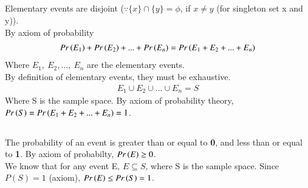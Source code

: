 \documentclass[journal,12pt,twocolumn]{IEEEtran}
\begin{document}
\subsection{}
Elementary events are disjoint ($\because \{x\}\cap\{y\}=\phi$, if $x\neq y$ (for singleton set x and y)).\\
By axiom of probability 
\begin{align}
	Pr\left(E_1\right)+Pr\left(E_2\right)+...+Pr\left(E_n\right)=Pr\left(E_1+ E_2+ ...+ E_n\right)
\end{align}
Where $E_1,\ E_2,...,\ E_n$ are the elementary events.\\
By definition of elementary events, they must be exhaustive.
\begin{align}
	E_1\cup E_2\cup ...\cup E_n=S
\end{align}
Where S is the sample space. By axiom of probability theory, $Pr\left(S\right)=Pr\left(E_1+ E_2+ ...+ E_n\right)=1$.
\subsection{}
The probability of an event is greater than or equal to \textbf{0}, and less than or equal to \textbf{1}.
By axiom of probabilty, $Pr\left(E\right)\geq 0$.\\
We know that for any event E, $E\subseteq S$, where S is the sample space. Since $P(S)=1$ (axiom), $Pr\left(E\right)\leq Pr\left(S\right)=1$.\\
\end{document}
